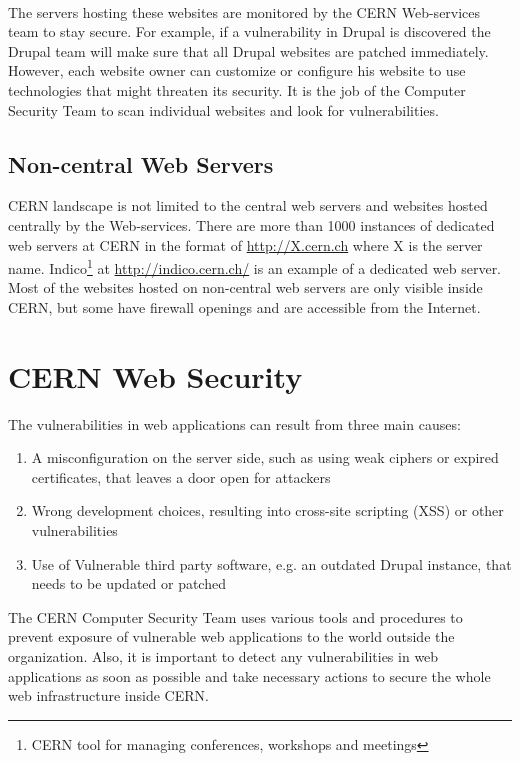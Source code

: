 \paragraph{}
The servers hosting these websites are monitored by the CERN Web-services team to stay secure. For example, if a vulnerability in Drupal is discovered the Drupal team will make sure that all Drupal websites are patched immediately. However, each website owner can customize or configure his website to use technologies that might threaten its security. It is the job of the Computer Security Team to scan individual websites and look for vulnerabilities. 
\subsection{Non-central Web Servers}
CERN landscape is not limited to the central web servers and websites hosted centrally by the Web-services. There are more than 1000 instances of dedicated web servers at CERN in the format of \url{http://X.cern.ch} where X is the server name. Indico\footnote{CERN tool for managing conferences, workshops and meetings} at \url{http://indico.cern.ch/} is an example of a dedicated web server. Most of the websites hosted on non-central web servers are only visible inside CERN, but some have firewall openings and are accessible from the Internet.

\section{CERN Web Security}
The vulnerabilities in web applications can result from three main causes:
\begin{enumerate}
\item A misconfiguration on the server side, such as using weak ciphers or expired certificates, that leaves a door open for attackers
\item Wrong development choices, resulting into cross-site scripting (XSS) or other vulnerabilities
\item Use of Vulnerable third party software, e.g. an outdated Drupal instance, that needs to be updated or patched
\end{enumerate}
The CERN Computer Security Team uses various tools and procedures to prevent exposure of vulnerable web applications to the world outside the organization. Also, it is important to detect any vulnerabilities in web applications as soon as possible and take necessary actions to secure the whole web infrastructure inside CERN.

